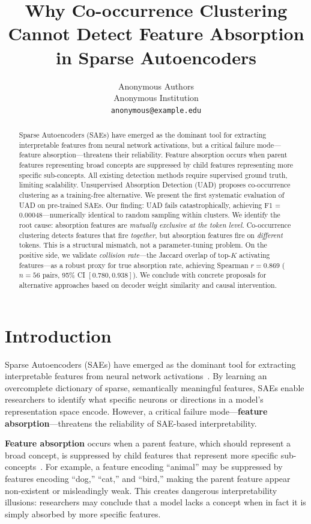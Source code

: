 \documentclass{article}
\title{Why Co-occurrence Clustering Cannot Detect Feature Absorption in Sparse Autoencoders}
\author{%
  Anonymous Authors\\
  Anonymous Institution\\
  \texttt{anonymous@example.edu}
}
\begin{document}
\maketitle

\begin{abstract}
Sparse Autoencoders (SAEs) have emerged as the dominant tool for extracting interpretable features from neural network activations, but a critical failure mode---feature absorption---threatens their reliability. Feature absorption occurs when parent features representing broad concepts are suppressed by child features representing more specific sub-concepts. All existing detection methods require supervised ground truth, limiting scalability. Unsupervised Absorption Detection (UAD) proposes co-occurrence clustering as a training-free alternative. We present the first systematic evaluation of UAD on pre-trained SAEs. Our finding: UAD fails catastrophically, achieving F1 = 0.00048---numerically identical to random sampling within clusters. We identify the root cause: absorption features are \emph{mutually exclusive at the token level}. Co-occurrence clustering detects features that fire \emph{together}, but absorption features fire on \emph{different} tokens. This is a structural mismatch, not a parameter-tuning problem. On the positive side, we validate \emph{collision rate}---the Jaccard overlap of top-$K$ activating features---as a robust proxy for true absorption rate, achieving Spearman $r = 0.869$ ($n = 56$ pairs, 95\% CI $[0.780, 0.938]$). We conclude with concrete proposals for alternative approaches based on decoder weight similarity and causal intervention.
\end{abstract}

\section{Introduction}

Sparse Autoencoders (SAEs) have emerged as the dominant tool for extracting interpretable features from neural network activations~\citep{bricken2023monosemanticity, cunningham2023sparse}. By learning an overcomplete dictionary of sparse, semantically meaningful features, SAEs enable researchers to identify what specific neurons or directions in a model's representation space encode. However, a critical failure mode---\textbf{feature absorption}---threatens the reliability of SAE-based interpretability.

\textbf{Feature absorption} occurs when a parent feature, which should represent a broad concept, is suppressed by child features that represent more specific sub-concepts~\citep{chanin2024absorption}. For example, a feature encoding ``animal'' may be suppressed by features encoding ``dog,'' ``cat,'' and ``bird,'' making the parent feature appear non-existent or misleadingly weak. This creates dangerous interpretability illusions: researchers may conclude that a model lacks a concept when in fact it is simply absorbed by more specific features.
\end{document}
